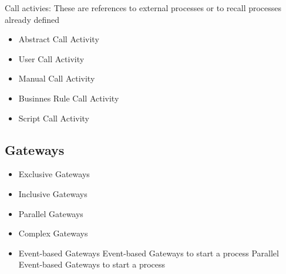 \documentclass[12pt, a4paper]{article}
\begin{document}
Call activies:
These are references to external processes or to recall processes already defined

\begin{itemize}
    \item Abstract Call Activity
    \item User Call Activity
    \item Manual Call Activity
    \item Businnes Rule Call Activity
    \item Script Call Activity
\end{itemize}

\subsection{Gateways}

\begin{itemize}
    \item Exclusive Gateways
    \item Inclusive Gateways
    \item Parallel Gateways
    \item Complex Gateways
    \item Event-based Gateways
    \subitem Event-based Gateways to start a process
    \subitem Parallel Event-based Gateways to start a process
\end{itemize}
\end{document}
